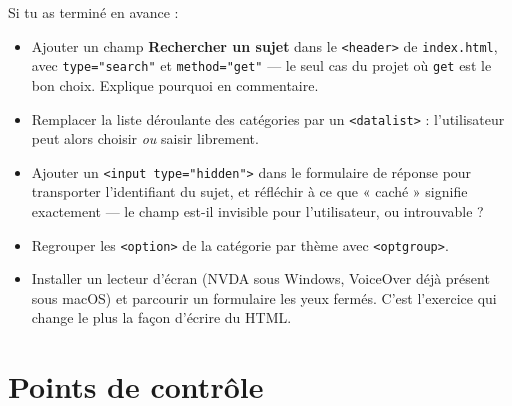 \documentclass[a4paper,11pt]{article}
\begin{document}
Si tu as terminé en avance :

\begin{itemize}
  \item Ajouter un champ \textbf{Rechercher un sujet} dans le \texttt{<header>} de \texttt{index.html}, avec \texttt{type="search"} et \texttt{method="get"} --- le seul cas du projet où \texttt{get} est le bon choix. Explique pourquoi en commentaire.
  \item Remplacer la liste déroulante des catégories par un \texttt{<datalist>} : l'utilisateur peut alors choisir \textit{ou} saisir librement.
  \item Ajouter un \texttt{<input type="hidden">} dans le formulaire de réponse pour transporter l'identifiant du sujet, et réfléchir à ce que « caché » signifie exactement --- le champ est-il invisible pour l'utilisateur, ou introuvable ?
  \item Regrouper les \texttt{<option>} de la catégorie par thème avec \texttt{<optgroup>}.
  \item Installer un lecteur d'écran (NVDA sous Windows, VoiceOver déjà présent sous macOS) et parcourir un formulaire les yeux fermés. C'est l'exercice qui change le plus la façon d'écrire du HTML.
\end{itemize}

\section{Points de contrôle}
\end{document}
